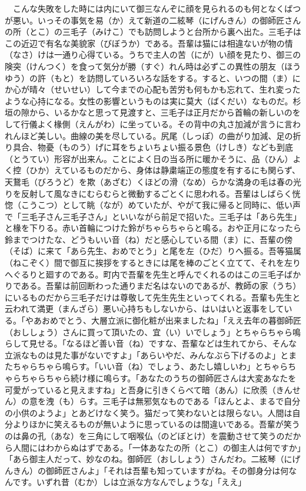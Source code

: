 　こんな失敗をした時には内にいて御三なんぞに顔を見られるのも何となくばつが悪い。いっその事気を易（か）えて新道の二絃琴（にげんきん）の御師匠さんの所（とこ）の三毛子（みけこ）でも訪問しようと台所から裏へ出た。三毛子はこの近辺で有名な美貌家（びぼうか）である。吾輩は猫には相違ないが物の情（なさ）けは一通り心得ている。うちで主人の苦（にが）い顔を見たり、御三の険突（けんつく）を食って気分が勝（すぐ）れん時は必ずこの異性の朋友（ほうゆう）の許（もと）を訪問していろいろな話をする。すると、いつの間（ま）にか心が晴々（せいせい）して今までの心配も苦労も何もかも忘れて、生れ変ったような心持になる。女性の影響というものは実に莫大（ばくだい）なものだ。杉垣の隙から、いるかなと思って見渡すと、三毛子は正月だから首輪の新しいのをして行儀よく椽側（えんがわ）に坐っている。その背中の丸さ加減が言うに言われんほど美しい。曲線の美を尽している。尻尾（しっぽ）の曲がり加減、足の折り具合、物憂（ものう）げに耳をちょいちょい振る景色（けしき）なども到底（とうてい）形容が出来ん。ことによく日の当る所に暖かそうに、品（ひん）よく控（ひか）えているものだから、身体は静粛端正の態度を有するにも関らず、天鵞毛（びろうど）を欺（あざむ）くほどの滑（なめ）らかな満身の毛は春の光りを反射して風なきにむらむらと微動するごとくに思われる。吾輩はしばらく恍惚（こうこつ）として眺（なが）めていたが、やがて我に帰ると同時に、低い声で「三毛子さん三毛子さん」といいながら前足で招いた。三毛子は「あら先生」と椽を下りる。赤い首輪につけた鈴がちゃらちゃらと鳴る。おや正月になったら鈴までつけたな、どうもいい音（ね）だと感心している間（ま）に、吾輩の傍（そば）に来て「あら先生、おめでとう」と尾を左（ひだ）りへ振る。吾等猫属（ねこぞく）間で御互に挨拶をするときには尾を棒のごとく立てて、それを左りへぐるりと廻すのである。町内で吾輩を先生と呼んでくれるのはこの三毛子ばかりである。吾輩は前回断わった通りまだ名はないのであるが、教師の家（うち）にいるものだから三毛子だけは尊敬して先生先生といってくれる。吾輩も先生と云われて満更（まんざら）悪い心持ちもしないから、はいはいと返事をしている。「やあおめでとう、大層立派に御化粧が出来ましたね」「ええ去年の暮御師匠（おししょう）さんに買って頂いたの、宜（い）いでしょう」とちゃらちゃら鳴らして見せる。「なるほど善い音（ね）ですな、吾輩などは生れてから、そんな立派なものは見た事がないですよ」「あらいやだ、みんなぶら下げるのよ」とまたちゃらちゃら鳴らす。「いい音（ね）でしょう、あたし嬉しいわ」とちゃらちゃらちゃらちゃら続け様に鳴らす。「あなたのうちの御師匠さんは大変あなたを可愛がっていると見えますね」と吾身に引きくらべて暗（あん）に欣羨（きんせん）の意を洩（も）らす。三毛子は無邪気なものである「ほんとよ、まるで自分の小供のようよ」とあどけなく笑う。猫だって笑わないとは限らない。人間は自分よりほかに笑えるものが無いように思っているのは間違いである。吾輩が笑うのは鼻の孔（あな）を三角にして咽喉仏（のどぼとけ）を震動させて笑うのだから人間にはわからぬはずである。「一体あなたの所（とこ）の御主人は何ですか」「あら御主人だって、妙なのね。御師匠（おししょう）さんだわ。二絃琴（にげんきん）の御師匠さんよ」「それは吾輩も知っていますがね。その御身分は何なんです。いずれ昔（むか）しは立派な方なんでしょうな」「ええ」\\
